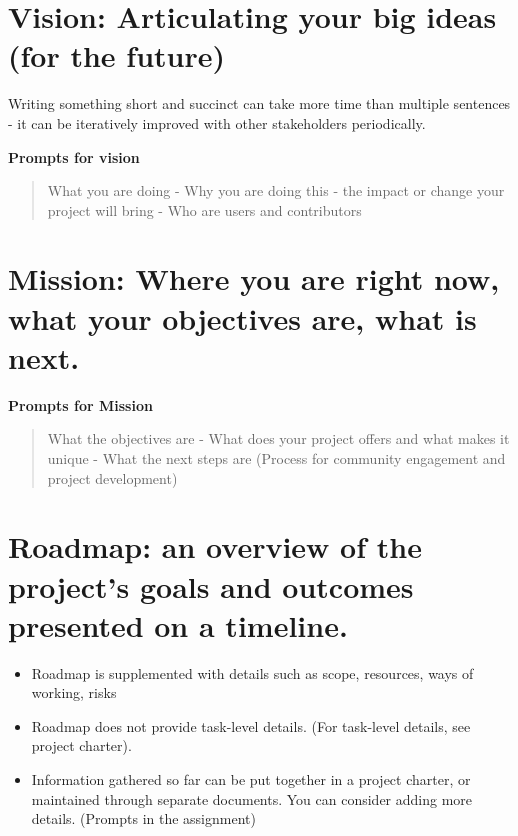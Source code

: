 \documentclass[
  letterpaper,
  DIV=11,
  numbers=noendperiod]{scrreport}
\providecommand{\tightlist}{%
  \setlength{\itemsep}{0pt}\setlength{\parskip}{0pt}}\usepackage{longtable,booktabs,array}
\begin{document}
\hypertarget{vision-articulating-your-big-ideas-for-the-future}{%
\section{Vision: Articulating your big ideas (for the
future)}\label{vision-articulating-your-big-ideas-for-the-future}}

Writing something short and succinct can take more time than multiple
sentences - it can be iteratively improved with other stakeholders
periodically.

\textbf{Prompts for vision}

\begin{quote}
What you are doing - Why you are doing this - the impact or change your
project will bring - Who are users and contributors
\end{quote}

\hypertarget{mission-where-you-are-right-now-what-your-objectives-are-what-is-next.}{%
\section{Mission: Where you are right now, what your objectives are,
what is
next.}\label{mission-where-you-are-right-now-what-your-objectives-are-what-is-next.}}

\textbf{Prompts for Mission}

\begin{quote}
What the objectives are - What does your project offers and what makes
it unique - What the next steps are (Process for community engagement
and project development)
\end{quote}

\hypertarget{roadmap-an-overview-of-the-projects-goals-and-outcomes-presented-on-a-timeline.}{%
\section{Roadmap: an overview of the project's goals and outcomes
presented on a
timeline.}\label{roadmap-an-overview-of-the-projects-goals-and-outcomes-presented-on-a-timeline.}}

\begin{itemize}
\tightlist
\item
  Roadmap is supplemented with details such as scope, resources, ways of
  working, risks
\item
  Roadmap does not provide task-level details. (For task-level details,
  see project charter).
\item
  Information gathered so far can be put together in a project charter,
  or maintained through separate documents. You can consider adding more
  details. (Prompts in the assignment)
\end{itemize}
\end{document}
